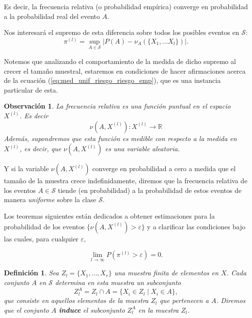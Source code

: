 \documentclass{report}
\newtheorem{dfn}{Definición}[section]
\newtheorem{obs}{Observación}[section]
\begin{document}
Es decir, la frecuencia relativa (o probabilidad empírica) converge en probabilidad a la probabilidad real del evento $A$.\newline

Nos interesará el supremo de esta diferencia sobre todos los posibles eventos en $\mathcal{S}$:
\begin{equation}
    \pi^{(l)} = \sup_{A\in\mathcal{S}} |P(A)-\nu_A(\{X_1,\dots X_l\})|. \label{def: funcion pi}
\end{equation}

Notemos que analizando el comportamiento de la medida de dicho supremo al crecer el tamaño muestral, 
estaremos en condiciones de hacer afirmaciones acerca de la ecuación (\ref{eq:med_unif_riesgo_riesgo_emp}),
que es una instancia particular de esta.\newline

\begin{obs}
La frecuencia relativa es una función puntual en el espacio \( X^{(l)} \). Es decir
\[ \nu(A, X^{(l)}): X^{(l)} \rightarrow \mathbb{R}
\]
Además, supondremos que esta función es medible con respecto a la medida en \( X^{(l)} \), 
es decir, que \( \nu(A, X^{(l)}) \) es una variable aleatoria.
\end{obs} 

Y si la variable \( \nu(A, X^{(l)}) \) converge en probabilidad a cero a medida que 
el tamaño de la muestra crece indefinidamente, diremos que la frecuencia relativa 
de los eventos \( A \in \mathcal{S} \) tiende (en probabilidad) a la probabilidad 
de estos eventos de manera \textit{uniforme} sobre la clase \( \mathcal{S} \).\newline

Los teoremas siguientes están dedicados a obtener estimaciones para la probabilidad 
de los eventos \( \{ \nu(A, X^{(l)}) > \varepsilon \} \) y a clarificar las condiciones 
bajo las cuales, para cualquier \( \varepsilon \),

\[
\lim_{l \to \infty} P\left(\pi^{(l)} > \varepsilon\right) = 0.
\]
\bigskip


\begin{dfn}
Sea \( Z_l = \{X_1, \dots, X_r\} \) una muestra finita de elementos en \( X \). 
Cada conjunto \( A \) en \( \mathcal{S} \) determina en esta muestra un subconjunto 
\[ 
    Z_l^A = Z_l \cap A = \{X_i \in Z_l \mid X_i \in A\}, 
\]
que consiste en aquellos elementos de la 
muestra \( Z_l \) que pertenecen a \( A \). Diremos que el conjunto \( A \) \textbf{induce} 
el subconjunto \( Z_l^A  \) en la muestra \( Z_l \).
\end{dfn}
\bigskip
\end{document}
